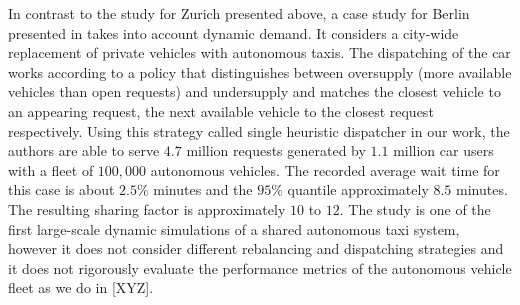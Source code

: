 In contrast to the study for Zurich presented above, a case study for Berlin
presented in \cite{bischoff2016simulation} takes into account dynamic demand.
It considers a city-wide replacement of private vehicles with autonomous taxis.
 The dispatching of the car works according to a policy that distinguishes
 between oversupply (more available vehicles than open requests) and undersupply
 and matches the closest vehicle to an appearing request, the next available
 vehicle to the closest request respectively. Using this strategy called single
 heuristic dispatcher in our work, the authors are able to serve $4.7$ million
 requests generated by $1.1$ million car users with a fleet of $100,000$ autonomous
 vehicles. The recorded average wait time for this case is about $2.5 \%$ minutes
 and the $95\%$ quantile approximately $8.5$ minutes. The resulting sharing factor
 is approximately $10$ to $12$. The study is one of the first large-scale dynamic
 simulations of a shared autonomous taxi system, however it does not consider
 different rebalancing and dispatching strategies and it does not rigorously
 evaluate the performance metrics of the autonomous vehicle fleet as we do in [XYZ].









